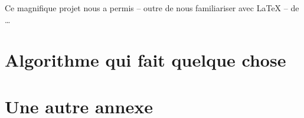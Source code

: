 \documentclass[a4paper, 12pt]{article}
\begin{document}
Ce magnifique projet nous a permis -- outre de nous familiariser avec \LaTeX{} -- de \ldots

\clearpage 




\clearpage 
\appendix
\bigskip{}
\section{Algorithme qui fait quelque chose}


\clearpage 
\section{Une autre annexe}
\cite{DH76}
\end{document}

